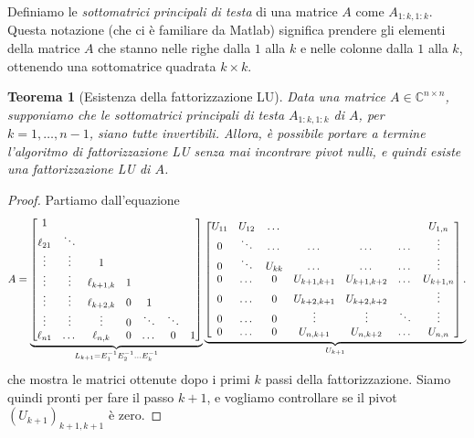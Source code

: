 \documentclass[a4paper]{report}
\newtheorem{theorem}{Teorema}[chapter]
\theoremstyle{definition}
\theoremstyle{remark}
\begin{document}
Definiamo le \emph{sottomatrici principali di testa} di una matrice $A$ come $A_{1:k,1:k}$. Questa notazione (che ci è familiare da Matlab) significa prendere gli elementi della matrice $A$ che stanno nelle righe dalla $1$ alla $k$ e nelle colonne dalla $1$ alla $k$, ottenendo una sottomatrice quadrata $k\times k$.

\begin{theorem}[Esistenza della fattorizzazione LU] \label{thm:esistenzaLU}
Data una matrice $A\in\mathbb{C}^{n\times n}$, supponiamo che le sottomatrici principali di testa $A_{1:k,1:k}$ di $A$, per $k=1,\dots,n-1$, siano tutte invertibili. Allora, è possibile portare a termine l'algoritmo di fattorizzazione LU senza mai incontrare pivot nulli, e quindi esiste una fattorizzazione LU di $A$.
\end{theorem}
\begin{proof}
Partiamo dall'equazione
\begin{equation} \label{fattLU}
A = 
\underbrace{
\begin{bmatrix}
    \vphantom{\ell_{k+1,k}}  1\\
    \vphantom{\ell_{k+1,k}} \ell_{21} & \ddots\\
    \vphantom{\ell_{k+1,k}}  \vdots & \vdots & 1\\
    \vphantom{\ell_{k+1,k}}  \vdots & \vdots & \ell_{k+1,k} & 1\\
    \vphantom{\ell_{k+1,k}}  \vdots & \vdots & \ell_{k+2,k} & 0 & 1\\
    \vphantom{\ell_{k+1,k}}  \vdots & \vdots & \vdots & 0 & \ddots & \ddots\\
    \vphantom{\ell_{k+1,k}}  \ell_{n1} & \dots & \ell_{n,k} & 0 & \dots & 0 & 1\\
\end{bmatrix}
}_{L_{k+1} = E_1^{-1}E_2^{-1}\dots E_k^{-1}}
\underbrace{
\begin{bmatrix}
     \vphantom{\ell_{k+1,k}} U_{11} & U_{12} & \dots & & & &U_{1,n} \\
     \vphantom{\ell_{k+1,k}} 0 & \ddots  & \dots & \dots & \dots &\dots & \vdots\\
     \vphantom{\ell_{k+1,k}} 0 & \ddots & U_{kk} & \dots & \dots & \dots & \vdots\\
     \vphantom{\ell_{k+1,k}} 0 & \dots & 0 & U_{k+1,k+1} & U_{k+1,k+2} & \dots & U_{k+1,n}\\
     \vphantom{\ell_{k+1,k}} 0 & \dots & 0 & U_{k+2,k+1} & U_{k+2,k+2} & &\vdots\\
     \vphantom{\ell_{k+1,k}} 0 & \dots & 0 & \vdots & \vdots& \ddots & \vdots\\
     \vphantom{\ell_{k+1,k}} 0 & \dots & 0 & U_{n,k+1} & U_{n,k+2} & \dots & U_{n,n}\\
\end{bmatrix}.
}_{U_{k+1}}
\end{equation}
che mostra le matrici ottenute dopo i primi $k$ passi della fattorizzazione. Siamo quindi pronti per fare il passo $k+1$, e vogliamo controllare se il pivot $(U_{k+1})_{k+1,k+1}$ è zero.


\end{proof}
\end{document}
